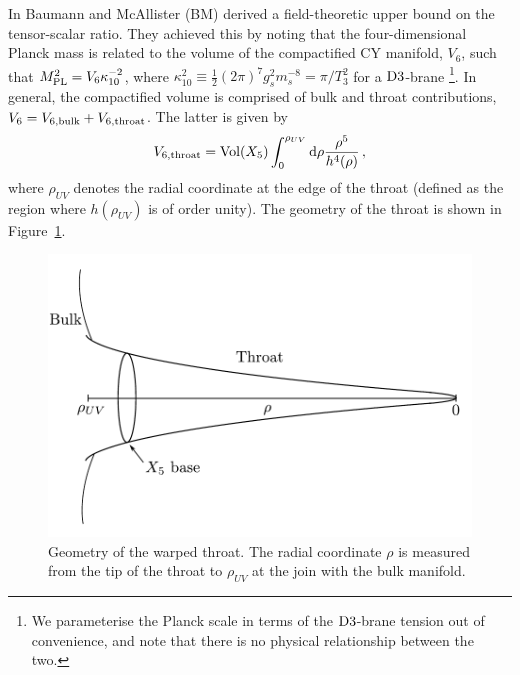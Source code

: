 In  Baumann and McAllister (BM)  
derived a field-theoretic upper bound on the tensor-scalar ratio. They achieved
this by noting that the four-dimensional Planck mass is related 
to the volume of the compactified CY manifold, $V_6$, such that 
$M_{\mathrm{PL}}^2=V_6 \kappa_{10}^{-2}$, where $\kappa_{10}^2 \equiv 
\frac{1}{2} (2\pi )^7 g_s^2 m_s^{-8} = \pi /T_3^{2}$ for a 
${\rm D3}$-brane \footnote{We parameterise the Planck scale 
in terms of the ${\rm D3}$-brane tension out of convenience, 
and note that there is no physical relationship between the two.}.
In general, the compactified volume 
is comprised of bulk and throat contributions, 
$V_6 = V_{6,{\rm bulk}}+V_{6,{\rm throat}}$. The latter is 
given by
% 
\begin{equation}
\label{eq:throatvolume}
V_{6,\mathrm{throat}} = \mathrm{Vol}(X_5)  
\int_0^{\rho_{UV}} \mathrm{d}\rho \frac{\rho^5}{h^4(\rho )} \,,
\end{equation}
% 
where $\rho_{UV}$ denotes the radial coordinate at 
the edge of the throat (defined as the region 
where $h (\rho_{UV})$ is of order unity). The geometry of the throat is shown
in Figure~\ref{fig:throat-geom}.

% 
\begin{figure}
 \centering
 \includegraphics{./dbi/graphs/throat-geom.pdf}
 \caption{Geometry of the warped throat. The radial coordinate $\rho$ is
measured from the tip of the throat to $\rho_{UV}$ at the join with the bulk
manifold.}
 \label{fig:throat-geom}
\end{figure}

% 

